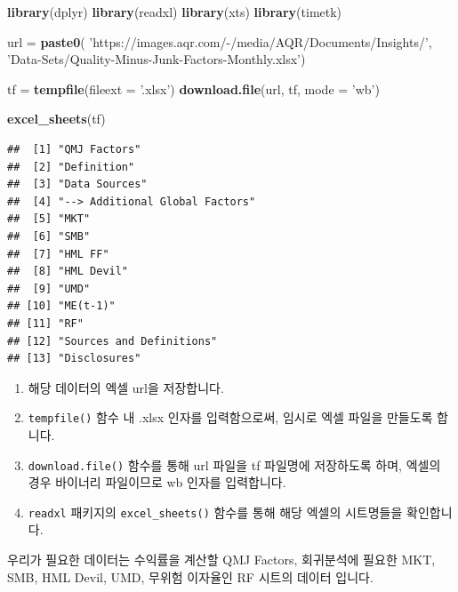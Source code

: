 \documentclass[12pt,]{book}
\newenvironment{Shaded}{\begin{snugshade}}{\end{snugshade}}
\newcommand{\DataTypeTok}[1]{\textcolor[rgb]{0.13,0.29,0.53}{#1}}
\newcommand{\KeywordTok}[1]{\textcolor[rgb]{0.13,0.29,0.53}{\textbf{#1}}}
\newcommand{\NormalTok}[1]{#1}
\newcommand{\StringTok}[1]{\textcolor[rgb]{0.31,0.60,0.02}{#1}}
\providecommand{\tightlist}{%
  \setlength{\itemsep}{0pt}\setlength{\parskip}{0pt}}
\begin{document}
\begin{Shaded}
\begin{Highlighting}[]
\KeywordTok{library}\NormalTok{(dplyr)}
\KeywordTok{library}\NormalTok{(readxl)}
\KeywordTok{library}\NormalTok{(xts)}
\KeywordTok{library}\NormalTok{(timetk)}

\NormalTok{url =}\StringTok{ }\KeywordTok{paste0}\NormalTok{(}
  \StringTok{'https://images.aqr.com/-/media/AQR/Documents/Insights/'}\NormalTok{,}
  \StringTok{'Data-Sets/Quality-Minus-Junk-Factors-Monthly.xlsx'}\NormalTok{)}

\NormalTok{tf =}\StringTok{ }\KeywordTok{tempfile}\NormalTok{(}\DataTypeTok{fileext =} \StringTok{'.xlsx'}\NormalTok{)}
\KeywordTok{download.file}\NormalTok{(url, tf, }\DataTypeTok{mode =} \StringTok{'wb'}\NormalTok{)}

\KeywordTok{excel_sheets}\NormalTok{(tf)}
\end{Highlighting}
\end{Shaded}

\begin{verbatim}
##  [1] "QMJ Factors"                  
##  [2] "Definition"                   
##  [3] "Data Sources"                 
##  [4] "--> Additional Global Factors"
##  [5] "MKT"                          
##  [6] "SMB"                          
##  [7] "HML FF"                       
##  [8] "HML Devil"                    
##  [9] "UMD"                          
## [10] "ME(t-1)"                      
## [11] "RF"                           
## [12] "Sources and Definitions"      
## [13] "Disclosures"
\end{verbatim}

\begin{enumerate}
\def\labelenumi{\arabic{enumi}.}
\tightlist
\item
  해당 데이터의 엑셀 url을 저장합니다.
\item
  \texttt{tempfile()} 함수 내 .xlsx 인자를 입력함으로써, 임시로 엑셀 파일을 만들도록 합니다.
\item
  \texttt{download.file()} 함수를 통해 url 파일을 tf 파일명에 저장하도록 하며, 엑셀의 경우 바이너리 파일이므로 wb 인자를 입력합니다.
\item
  \texttt{readxl} 패키지의 \texttt{excel\_sheets()} 함수를 통해 해당 엑셀의 시트명들을 확인합니다.
\end{enumerate}

우리가 필요한 데이터는 수익률을 계산할 QMJ Factors, 회귀분석에 필요한 MKT, SMB, HML Devil, UMD, 무위험 이자율인 RF 시트의 데이터 입니다.
\end{document}
